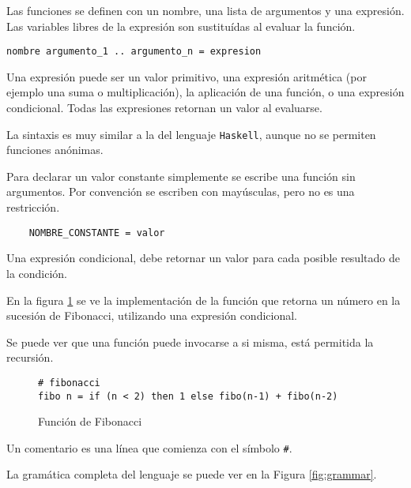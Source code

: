 
  Las funciones se definen con un nombre, una lista de argumentos y una 
expresión. Las variables libres de la expresión son sustituídas al evaluar
la función.

\begin{verbatim}
nombre argumento_1 .. argumento_n = expresion
\end{verbatim}

  Una expresión puede ser un valor primitivo,
una expresión aritmética (por ejemplo una suma o multiplicación),
la aplicación de una función, o una expresión condicional.
  Todas las expresiones retornan un valor al evaluarse.

  La sintaxis es muy similar a la del lenguaje \texttt{Haskell}, aunque
no se permiten funciones anónimas.

  Para declarar un valor constante simplemente se escribe una función sin
argumentos. Por convención se escriben con mayúsculas, pero no es una
restricción.

\begin{verbatim}
    NOMBRE_CONSTANTE = valor
\end{verbatim}

  Una expresión condicional, debe retornar un valor para cada posible
resultado de la condición.

  En la figura \ref{fig:fibo} se ve la implementación
de la función que retorna un número en la sucesión de Fibonacci,
utilizando una expresión condicional.

  Se puede ver que una función puede invocarse a si misma, está permitida
la recursión.

\begin{figure}[h!]
\begin{center}
  \caption{Función de Fibonacci}
  \begin{Verbatim}[frame=single]
# fibonacci
fibo n = if (n < 2) then 1 else fibo(n-1) + fibo(n-2)
  \end{Verbatim}
   \label{fig:fibo}
\end{center}
\end{figure}

  Un comentario es una línea que comienza con el símbolo \texttt{\#}.

  La gramática completa del lenguaje se puede ver en la
Figura \ref{fig:grammar}.



